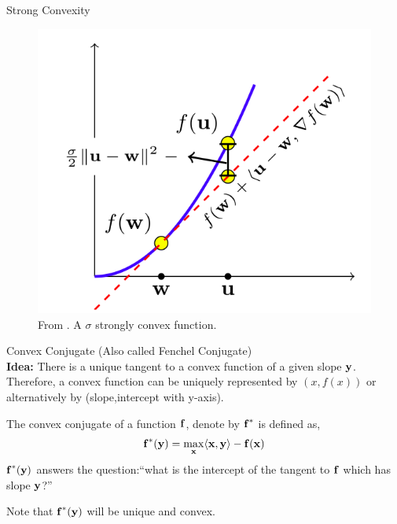 \begin{frame}{Strong Convexity}
  \begin{figure}
    \includegraphics[scale=0.27]{images/str_convex.png}
    \caption{From \cite{ShSh2012}. A $\sigma$ strongly convex function.}
  \end{figure}
\end{frame}


\begin{frame}{Convex Conjugate}
  (Also called Fenchel Conjugate)\\
  {\bf Idea:} There is a unique tangent to a convex function of a given slope $\operatorname{\mathbf{y}}$. Therefore, a convex function can be uniquely represented by $(x,f(x))$ or alternatively by (slope,intercept with y-axis).
  \begin{definition}
    The convex conjugate of a function $\operatorname{\mathbf{f}}$, denote by ${\operatorname{\mathbf{f}}}^{*}$ is defined as,
    \begin{align*}
      {\operatorname{\mathbf{f}}}^{*}(\operatorname{\mathbf{y}}) = \max_{\operatorname{\mathbf{x}}} \langle {\operatorname{\mathbf{x}}} , {\operatorname{\mathbf{y}}} \rangle - \operatorname{\mathbf{f}}(\operatorname{\mathbf{x}})
    \end{align*}
    ${\operatorname{\mathbf{f}}}^{*}(\operatorname{\mathbf{y}})$ answers the question:``what is the intercept of the tangent to $\operatorname{\mathbf{f}}$ which has slope $\operatorname{\mathbf{y}}$?''
  \end{definition}
  Note that ${\operatorname{\mathbf{f}}}^{*}(\operatorname{\mathbf{y}})$ will be unique and convex.
\end{frame}


